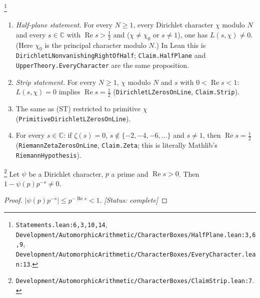 \begin{definition}\label{def:E-statements}
\footnote{\nolinkurl{Statements.lean:6,3,10,14}, \nolinkurl{Development/AutomorphicArithmetic/CharacterBoxes/HalfPlane.lean:3,6,9}, \nolinkurl{Development/AutomorphicArithmetic/CharacterBoxes/EveryCharacter.lean:13}.}%
\begin{enumerate}
\item[(HP)] \emph{Half-plane statement.} For every $N\ge1$, every Dirichlet character $\chi$ modulo
$N$ and every $s\in\mathbb C$ with $\operatorname{Re}s>\tfrac12$ and ($\chi\neq\chi_0$ or $s\neq1$),
one has $L(s,\chi)\neq0$. (Here $\chi_0$ is the principal character modulo $N$.) In Lean this is
\texttt{DirichletLNonvanishingRightOfHalf}; \texttt{Claim.HalfPlane} and
\texttt{UpperTheory.EveryCharacter} are the same proposition.
\item[(ST)] \emph{Strip statement.} For every $N\ge1$, $\chi$ modulo $N$ and $s$ with
$0<\operatorname{Re}s<1$: $L(s,\chi)=0$ implies $\operatorname{Re}s=\tfrac12$
(\texttt{DirichletLZerosOnLine}, \texttt{Claim.Strip}).
\item[(PR)] The same as (ST) restricted to primitive $\chi$
(\texttt{PrimitiveDirichletLZerosOnLine}).
\item[(Z)] For every $s\in\mathbb C$: if $\zeta(s)=0$, $s\notin\{-2,-4,-6,\dots\}$ and $s\neq1$, then
$\operatorname{Re}s=\tfrac12$ (\texttt{RiemannZetaZerosOnLine}, \texttt{Claim.Zeta}; this is
literally Mathlib's \texttt{RiemannHypothesis}).
\end{enumerate}
\end{definition}

\begin{lemma}\label{lem:E-euler-factor}
\footnote{\nolinkurl{Development/AutomorphicArithmetic/CharacterBoxes/ClaimStrip.lean:7}.}%
Let $\psi$ be a Dirichlet character, $p$ a prime and $\operatorname{Re}s>0$. Then
$1-\psi(p)p^{-s}\neq0$.
\end{lemma}
\begin{proof}
$|\psi(p)p^{-s}|\le p^{-\operatorname{Re}s}<1$.
\textit{[Status: complete]}
\end{proof}

